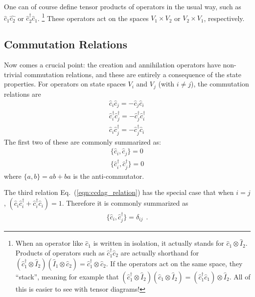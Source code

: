 \documentclass[aps, superscriptaddress, floatfix, onecolumn]{revtex4-2}
\begin{document}
One can of course define tensor products of operators in the usual way, such as $\hat{c}_1 \hat{c_2}$ or $\hat{c}^\dagger_2  \hat{c}_1$.
\footnote{When an operator like $\hat{c}_1$ is written in isolation, it actually stands for $\hat{c}_1 \otimes \hat{I}_2$. Products of operators such as $\hat{c}^\dagger_1 \hat{c}_2$ are actually shorthand for $(\hat{c}^\dagger_1 \otimes \hat{I}_2) (\hat{I}_1 \otimes \hat{c}_2) = \hat{c}^\dagger_1 \otimes \hat{c}_2$.
If the operators act on the same space, they ``stack'', meaning for example that $(\hat{c}^\dagger_1 \otimes \hat{I}_2) (\hat{c}_1 \otimes \hat{I}_2) = (\hat{c}^\dagger_1 \hat{c}_1) \otimes \hat{I}_2$. All of this is easier to see with tensor diagrams!}
These operators act on the spaces $V_1 \times V_2$ or $V_2 \times V_1$, respectively.

\subsection{Commutation Relations}

Now comes a crucial point: the creation and annihilation operators have non-trivial commutation relations, and these are entirely a consequence of the state properties. For operators on state spaces $V_i$ and $V_j$ (with $i \neq j$), the commutation relations are
\begin{align}
\hat{c}_i  \hat{c}_j = -  \hat{c}_j  \hat{c}_i \\ 
\hat{c}^\dagger_i  \hat{c}^\dagger_j = -  \hat{c}^\dagger_j  \hat{c}^\dagger_i \\ 
\hat{c}_i  \hat{c}^\dagger_j = -  \hat{c}^\dagger_j  \hat{c}_i  \label{eqn:ccdag_relation}
\end{align}
The first two of these are commonly summarized as:
\begin{align}
\{ \hat{c}_i, \hat{c}_j \} = 0 \nonumber \\
\{ \hat{c}^\dagger_i, \hat{c}^\dagger_j \} = 0
\end{align}
where $\{ a, b \} = a b + b a$ is the anti-commutator.

The third relation Eq.~(\ref{eqn:ccdag_relation}) has the special case that when $i=j$, $(\hat{c}_i \hat{c}^\dagger_i + \hat{c}^\dagger_i \hat{c}_i) = 1$. Therefore it is commonly summarized as 
\begin{align}
\{ \hat{c}_i, \hat{c}^\dagger_j \} = \delta_{ij} \ \ .
\end{align}
\end{document}
